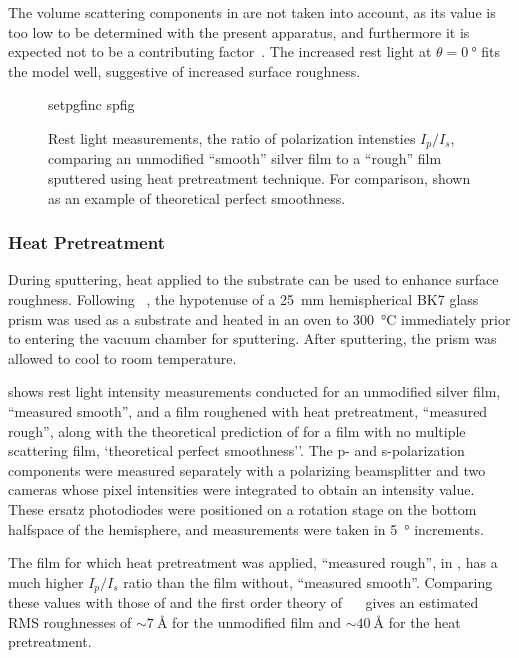 The volume scattering components in  are not taken
into account, as its value is too low to be determined with the present
apparatus, and furthermore it is expected not to be a contributing
factor~\cite{kretschmann1972decay}.  The increased rest light at
$\theta=\SI{0}{\degree}$ fits the model well, suggestive of increased
surface roughness.
\begin{figure}[ht]
 \centering
 {setpgfinc}
 {spfig}
 \caption{Rest light measurements, the ratio of polarization intensties
									$I_p/I_s$,  comparing an unmodified ``smooth'' silver film
									to a ``rough'' film sputtered using heat pretreatment
									technique.  For comparison,  shown
									as an example of theoretical perfect smoothness.}
\label{fig:spratio}
\end{figure}

\subsubsection{Heat Pretreatment}
During sputtering, heat applied to the substrate can be used to enhance
surface roughness.  Following ~\cite{horstmann1977multiple},
the hypotenuse of a \SI{25}{\milli\meter} hemispherical BK7 glass prism was
used as a substrate and heated in an oven to \SI{300}{\celsius} immediately prior
to entering the vacuum chamber for sputtering.  After sputtering, the prism
was allowed to cool to room temperature.

 shows rest light intensity measurements conducted for an
unmodified silver film, ``measured smooth'', and a film roughened with heat
pretreatment, ``measured rough'', along with the theoretical prediction of
 for a film with no multiple scattering film,
`theoretical perfect smoothness''.  The p- and s-polarization components were
measured separately with a polarizing beamsplitter and two cameras whose
pixel intensities were integrated to obtain an intensity value.  These ersatz
photodiodes were positioned on a rotation stage on the bottom halfspace of the
hemisphere, and measurements were taken in \SI{5}{\degree} increments.

The film for which heat pretreatment was applied, ``measured rough'', in
, has a much higher $I_p/I_s$ ratio than the film without,
``measured smooth''.  Comparing these values with those of 
and the first order theory of
~\cite{kroger1970scattering}~\cite{horstmann1977multiple} gives
an estimated RMS roughnesses of $\sim\SI{7}{\angstrom}$ for the unmodified
film and $\sim\SI{40}{\angstrom}$ for the heat pretreatment.

